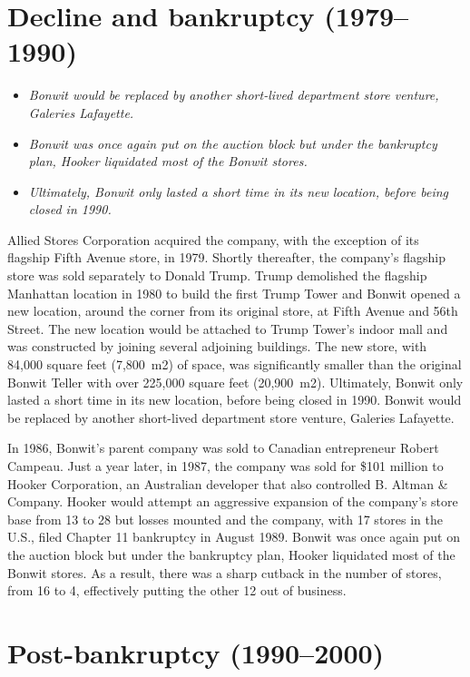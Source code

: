\section{Decline and bankruptcy
(1979--1990)}\label{decline-and-bankruptcy-19791990}

\begin{itemize}
\item
  \emph{Bonwit would be replaced by another short-lived department store
  venture, Galeries Lafayette.}
\item
  \emph{Bonwit was once again put on the auction block but under the
  bankruptcy plan, Hooker liquidated most of the Bonwit stores.}
\item
  \emph{Ultimately, Bonwit only lasted a short time in its new location,
  before being closed in 1990.}
\end{itemize}

Allied Stores Corporation acquired the company, with the exception of
its flagship Fifth Avenue store, in 1979. Shortly thereafter, the
company's flagship store was sold separately to Donald Trump. Trump
demolished the flagship Manhattan location in 1980 to build the first
Trump Tower and Bonwit opened a new location, around the corner from its
original store, at Fifth Avenue and 56th Street. The new location would
be attached to Trump Tower's indoor mall and was constructed by joining
several adjoining buildings. The new store, with 84,000 square feet
(7,800~m2) of space, was significantly smaller than the original Bonwit
Teller with over 225,000 square feet (20,900~m2). Ultimately, Bonwit
only lasted a short time in its new location, before being closed in
1990. Bonwit would be replaced by another short-lived department store
venture, Galeries Lafayette.

In 1986, Bonwit's parent company was sold to Canadian entrepreneur
Robert Campeau. Just a year later, in 1987, the company was sold for
\$101 million to Hooker Corporation, an Australian developer that also
controlled B. Altman \& Company. Hooker would attempt an aggressive
expansion of the company's store base from 13 to 28 but losses mounted
and the company, with 17 stores in the U.S., filed Chapter 11 bankruptcy
in August 1989. Bonwit was once again put on the auction block but under
the bankruptcy plan, Hooker liquidated most of the Bonwit stores. As a
result, there was a sharp cutback in the number of stores, from 16 to 4,
effectively putting the other 12 out of business.

\section{Post-bankruptcy (1990--2000)}\label{post-bankruptcy-19902000}

